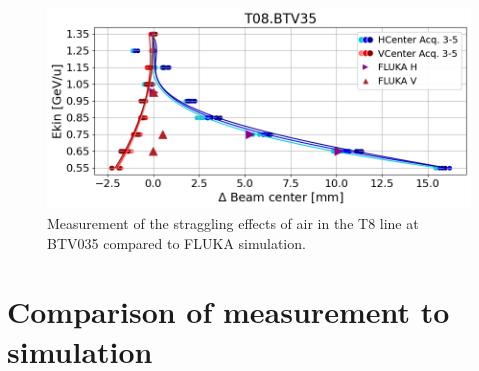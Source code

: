 \documentclass[a4paper,
               biblatex,     %
               ]{jacow}
\begin{document}
\begin{figure}[!htb]
   \centering
   \includegraphics*[width=1.0\columnwidth]{THPR032_f3.png}
   \caption{Measurement of the straggling effects of air in the T8 line at BTV035 compared to FLUKA simulation.}
   \label{fig:straggling_effects}
\end{figure}




\section{Comparison of measurement to simulation}



\end{document}
